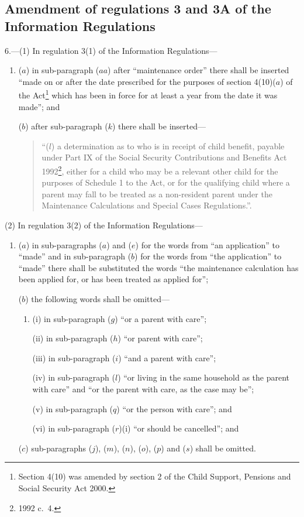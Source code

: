 \documentclass[12pt,a4paper]{article}
\begin{document}
\subsection[6. Amendment of regulations 3 and 3A of the Information Regulations]{Amendment of regulations 3 and 3A of the Information Regulations}

6.---(1)  In regulation 3(1) of the Information Regulations—
\begin{enumerate}\item[]
($a$) in sub-paragraph ($aa$)  after “maintenance order” there shall be inserted “made on or after the date prescribed for the purposes of section 4(10)($a$)  of the Act\footnote{Section 4(10) was amended by section 2 of the Child Support, Pensions and Social Security Act 2000.} which has been in force for at least a year from the date it was made”; and

($b$) after sub-paragraph ($k$)  there shall be inserted—
\begin{quotation}
“($l$) a determination as to who is in receipt of child benefit, payable under Part IX of the Social Security Contributions and Benefits Act 1992\footnote{1992 c.\ 4.}, either for a child who may be a relevant other child for the purposes of Schedule 1 to the Act, or for the qualifying child where a parent may fall to be treated as a non-resident parent under the Maintenance Calculations and Special Cases Regulations.”.
\end{quotation}
\end{enumerate}

(2) In regulation 3(2) of the Information Regulations—
\begin{enumerate}\item[]
($a$) in sub-paragraphs ($a$)  and ($e$)  for the words from “an application” to “made” and in sub-paragraph ($b$)  for the words from “the application” to “made” there shall be substituted the words “the maintenance calculation has been applied for, or has been treated as applied for”;

($b$) the following words shall be omitted—
\begin{enumerate}\item[]
(i) in sub-paragraph ($g$)  “or a parent with care”;

(ii) in sub-paragraph ($h$)  “or parent with care”;

(iii) in sub-paragraph ($i$)  “and a parent with care”;

(iv) in sub-paragraph ($l$)  “or living in the same household as the parent with care” and “or the parent with care, as the case may be”;

(v) in sub-paragraph ($q$)  “or the person with care”; and

(vi) in sub-paragraph ($r$)(i)  “or should be cancelled”; and
\end{enumerate}

($c$) sub-paragraphs ($j$), ($m$), ($n$), ($o$), ($p$)  and ($s$)  shall be omitted.
\end{enumerate}
\end{document}
